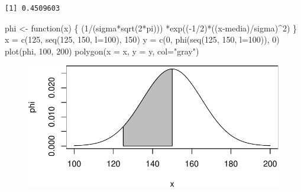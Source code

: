\documentclass[
  letterpaper,
  DIV=11,
  numbers=noendperiod]{scrartcl}
\newenvironment{Shaded}{\begin{snugshade}}{\end{snugshade}}
\newcommand{\AttributeTok}[1]{\textcolor[rgb]{0.40,0.45,0.13}{#1}}
\newcommand{\ControlFlowTok}[1]{\textcolor[rgb]{0.00,0.23,0.31}{#1}}
\newcommand{\DecValTok}[1]{\textcolor[rgb]{0.68,0.00,0.00}{#1}}
\newcommand{\FunctionTok}[1]{\textcolor[rgb]{0.28,0.35,0.67}{#1}}
\newcommand{\NormalTok}[1]{\textcolor[rgb]{0.00,0.23,0.31}{#1}}
\newcommand{\OtherTok}[1]{\textcolor[rgb]{0.00,0.23,0.31}{#1}}
\newcommand{\SpecialCharTok}[1]{\textcolor[rgb]{0.37,0.37,0.37}{#1}}
\newcommand{\StringTok}[1]{\textcolor[rgb]{0.13,0.47,0.30}{#1}}
\begin{document}
\begin{verbatim}
[1] 0.4509603
\end{verbatim}

\begin{Shaded}
\begin{Highlighting}[]
\NormalTok{phi }\OtherTok{\textless{}{-}} \ControlFlowTok{function}\NormalTok{(x) \{ }
\NormalTok{  (}\DecValTok{1}\SpecialCharTok{/}\NormalTok{(sigma}\SpecialCharTok{*}\FunctionTok{sqrt}\NormalTok{(}\DecValTok{2}\SpecialCharTok{*}\NormalTok{pi))) }\SpecialCharTok{*}\FunctionTok{exp}\NormalTok{((}\SpecialCharTok{{-}}\DecValTok{1}\SpecialCharTok{/}\DecValTok{2}\NormalTok{)}\SpecialCharTok{*}\NormalTok{((x}\SpecialCharTok{{-}}\NormalTok{media)}\SpecialCharTok{/}\NormalTok{sigma)}\SpecialCharTok{\^{}}\DecValTok{2}\NormalTok{) }
\NormalTok{\}}
\NormalTok{x }\OtherTok{=} \FunctionTok{c}\NormalTok{(}\DecValTok{125}\NormalTok{, }\FunctionTok{seq}\NormalTok{(}\DecValTok{125}\NormalTok{, }\DecValTok{150}\NormalTok{, }\AttributeTok{l=}\DecValTok{100}\NormalTok{), }\DecValTok{150}\NormalTok{)}
\NormalTok{y }\OtherTok{=} \FunctionTok{c}\NormalTok{(}\DecValTok{0}\NormalTok{, }\FunctionTok{phi}\NormalTok{(}\FunctionTok{seq}\NormalTok{(}\DecValTok{125}\NormalTok{, }\DecValTok{150}\NormalTok{, }\AttributeTok{l=}\DecValTok{100}\NormalTok{)), }\DecValTok{0}\NormalTok{)}
\FunctionTok{plot}\NormalTok{(phi, }\DecValTok{100}\NormalTok{, }\DecValTok{200}\NormalTok{)}
\FunctionTok{polygon}\NormalTok{(}\AttributeTok{x =}\NormalTok{ x, }\AttributeTok{y =}\NormalTok{ y, }\AttributeTok{col=}\StringTok{"gray"}\NormalTok{)}
\end{Highlighting}
\end{Shaded}

\begin{figure}[H]

{\centering \includegraphics{quiz5_files/figure-pdf/unnamed-chunk-6-1.pdf}

}

\end{figure}
\end{document}
